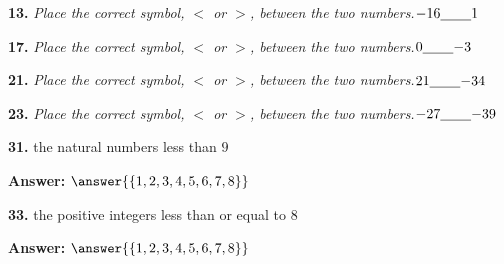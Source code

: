\documentclass{ximera}
\begin{document}
\begin{problem}
\textbf{13.} \emph{Place the correct symbol, $<$ or $>$, between the two numbers.}\quad $-16 \underline{\hspace{2.2em}} 1$

\begin{multipleChoice}
\choice{$>$}
\choice[correct]{$<$}
\end{multipleChoice}
\end{problem}

\begin{problem}
\textbf{17.} \emph{Place the correct symbol, $<$ or $>$, between the two numbers.}\quad $0 \underline{\hspace{2.2em}} {-3}$

\begin{multipleChoice}
\choice[correct]{$>$}
\choice{$<$}
\end{multipleChoice}
\end{problem}

\begin{problem}
\textbf{21.} \emph{Place the correct symbol, $<$ or $>$, between the two numbers.}\quad $21 \underline{\hspace{2.2em}} {-34}$

\begin{multipleChoice}
\choice[correct]{$>$}
\choice{$<$}
\end{multipleChoice}
\end{problem}

\begin{problem}
\textbf{23.} \emph{Place the correct symbol, $<$ or $>$, between the two numbers.}\quad $-27 \underline{\hspace{2.2em}} {-39}$

\begin{multipleChoice}
\choice{$<$}
\choice[correct]{$>$}
\end{multipleChoice}
\end{problem}

\begin{problem}
\textbf{31.} the natural numbers less than $9$

\textbf{Answer:} $\answer{\{1,2,3,4,5,6,7,8\}}$
\end{problem}

\begin{problem}
\textbf{33.} the positive integers less than or equal to $8$

\textbf{Answer:} $\answer{\{1,2,3,4,5,6,7,8\}}$
\end{problem}
\end{document}
